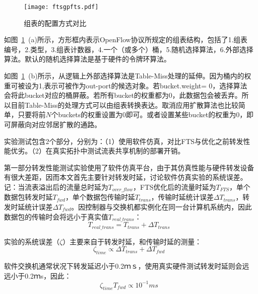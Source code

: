 \begin{figure}[!ht]
	\centering 
	\vspace{-1.5mm} 
	\texttt{[image: ftsgpfts.pdf]}
	\caption{组表的配置方式对比} \label{fig:ftsgpfts}
\end{figure}

如图~\ref{fig:ftsgpfts}~(a)所示，方形框内表示OpenFlow协议所规定的组表结构，包括了1.组表编号，2.类型，3.组表计数器，4.一个（或多个）桶，5.随机选择算法，6.外部选择算法。默认的随机选择算法是基于硬件的令牌环算法。

如图~\ref{fig:ftsgpfts}~(b)所示，从逻辑上外部选择算法是Table-Miss处理的延伸。因为桶内的权重可被设为1,表示可被作为out-port的候选对象。若bucket.weight= 0，选择算法会将此bucket对应的桶屏蔽。若所有bucket的权重都为0，此数据包会被丢弃。所以目前Table-Miss的处理方式可以由组表转换表达。取消应用扩散算法也比较简单，只要将前$ N $个buckets的权重设置为0即可。或者设置某些bucket的权重为0，即可屏蔽向对应邻居扩散的通路。





\label{chapftsevaluation}

实验测试包含2个部分，分别为：（1）使用软件仿真，对比FTS与优化之前转发性能优劣。（2）在真实拓扑中测试流表共享机制的部署开销。

第一部分转发性能测试实验使用了软件仿真平台，由于其仿真性能与硬件转发设备有很大差距，因而本文首先主要针对转发时延，讨论软件仿真实验的系统误差。记：当流表溢出后的流量总时延为$T_{over\_flow}$，FTS优化后的流量时延为$T_{FTS}$，单个数据包转发时延$T_{fwd}$，单个数据包传输时延$T_{trans}$，传输时延统计误差$\Delta T_{trans}$，转发时延统计误差$\Delta T_{fwd}$。因控制器与交换机都实例化在同一台计算机系统内，因此数据包的传输时会将远小于真实值$T_{real\_trans}$：
\begin{equation}\label{fts7}
T_{real\_trans} = T_{trans} + \Delta T_{trans}
\end{equation}

实验的系统误差（$\zeta$）主要来自于转发时延，和传输时延的测量：
\begin{equation}\label{fts8}
\zeta_{time} \propto \Delta T_{trans} + \Delta T_{fwd}
\end{equation}

软件交换机通常状况下转发延迟小于0.2ｍｓ，使用真实硬件测试转发时延则会远远小于0.2ｍs，因此：
\begin{equation}\label{fts9}
\zeta_{time} T_{fwd} \propto 10^{-1}ms
\end{equation}

